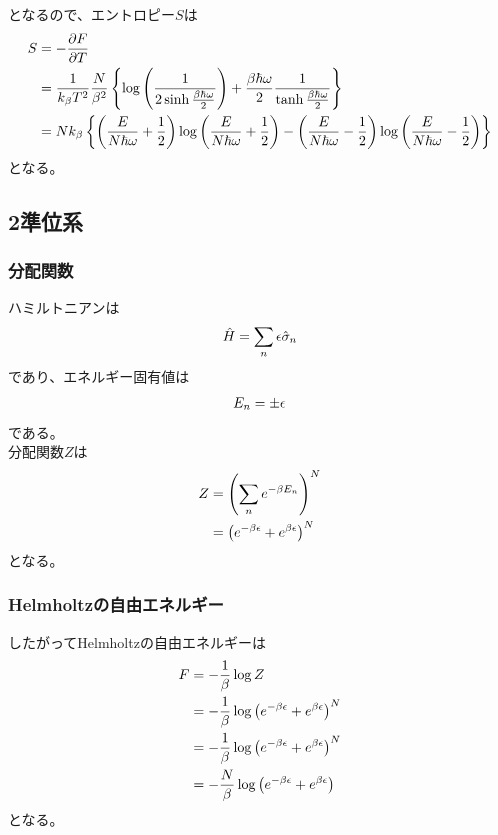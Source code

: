 \documentclass[dvipdfmx, 11pt, a4paper]{jsarticle}
\theoremstyle{definition}
\begin{document}
    となるので、エントロピー$S$は
    \begin{align}
        S &= -\frac{\partial F}{\partial T} \notag \\
        &= \frac{1}{k_\beta T^2} \frac{N}{\beta^2} \left\{ \log \left( \frac{1}{2\sinh \frac{\beta \hbar \omega}{2}} \right) + \frac{\beta \hbar \omega}{2} \frac{1}{\tanh \frac{\beta \hbar \omega}{2}} \right\} \\ 
        &= Nk_\beta \left\{ \left( \frac{E}{N\hbar \omega} + \frac{1}{2} \right) \log \left( \frac{E}{N\hbar \omega} + \frac{1}{2} \right) - \left(\frac{E}{N\hbar \omega } -\frac{1}{2} \right)  \log \left( \frac{E}{N\hbar \omega} - \frac{1}{2}  \right) \right\}
    \end{align}
    となる。
\subsection{2準位系}
\subsubsection{分配関数}
    ハミルトニアンは
    \begin{align}
        \hat{H} = \sum_n \epsilon \hat{\sigma}_n \notag 
    \end{align}
    であり、エネルギー固有値は
    \begin{align}
        E_n = \pm \epsilon \notag 
    \end{align}
    である。\\
    分配関数$Z$は
    \begin{align}
        Z &= \left( \sum_n e^{-\beta E_n} \right)^N \notag \\
        &= \left( e^{-\beta \epsilon} + e^{\beta \epsilon} \right)^N \notag 
    \end{align}
    となる。
\subsubsection{Helmholtzの自由エネルギー}
    したがってHelmholtzの自由エネルギーは
    \begin{align}
        F &= - \frac{1}{\beta} \log Z \notag \\
        &= -\frac{1}{\beta} \log \left( e^{-\beta \epsilon} + e^{\beta \epsilon} \right)^N \notag \\
        &= -\frac{1}{\beta} \log \left( e^{-\beta \epsilon} + e^{\beta \epsilon} \right)^N \notag \\
        &= -\frac{N}{\beta} \log \left( e^{-\beta \epsilon} + e^{\beta \epsilon} \right) 
    \end{align}
    となる。
\end{document}
